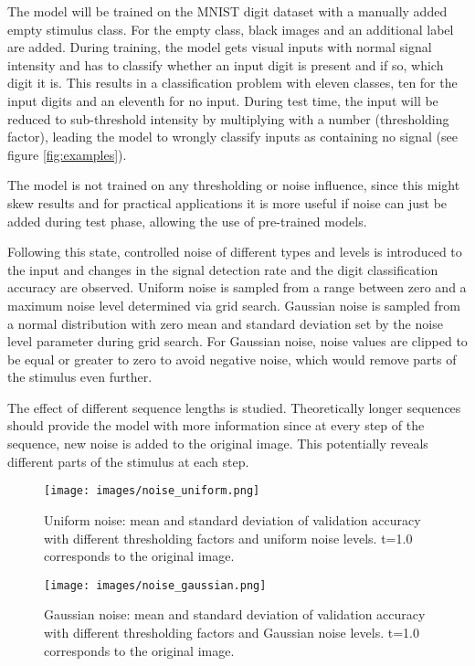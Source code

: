 \documentclass{article}
\begin{document}
The model will be trained on the MNIST digit dataset with a manually added empty stimulus class. For the empty class, black images and an additional label are added. During training, the model gets visual inputs with normal signal intensity and has to classify whether an input digit is present and if so, which digit it is. This results in a classification problem with eleven classes, ten for the input digits and an eleventh for no input. During test time, the input will be reduced to sub-threshold intensity by multiplying with a number (thresholding factor), leading the model to wrongly classify inputs as containing no signal (see figure \ref{fig:examples}).

The model is not trained on any thresholding or noise influence, since this might skew results and for practical applications it is more useful if noise can just be added during test phase, allowing the use of pre-trained models.

Following this state, controlled noise of different types and levels is introduced to the input and changes in the signal detection rate and the digit classification accuracy are observed. Uniform noise is sampled from a range between zero and a maximum noise level determined via grid search. Gaussian noise is sampled from a normal distribution with zero mean and standard deviation set by the noise level parameter during grid search. For Gaussian noise, noise values are clipped to be equal or greater to zero to avoid negative noise, which would remove parts of the stimulus even further.

The effect of different sequence lengths is studied. Theoretically longer sequences should provide the model with more information since at every step of the sequence, new noise is added to the original image. This potentially reveals different parts of the stimulus at each step.

\begin{figure}[thb]
\centering
\begin{minipage}{.475\textwidth}
    \centering
	\texttt{[image: images/noise\_uniform.png]}
	\caption{Uniform noise: mean and standard deviation of validation accuracy with different thresholding factors and uniform noise levels. t=1.0 corresponds to the original image.}
	\label{fig:noise_uniform}
\end{minipage}
\hfill
\begin{minipage}{.475\textwidth}
    \centering
	\texttt{[image: images/noise\_gaussian.png]}
	\caption{Gaussian noise: mean and standard deviation of validation accuracy with different thresholding factors and Gaussian noise levels. t=1.0 corresponds to the original image.}
	\label{fig:noise_gaussian}
\end{minipage}
\end{figure}
\end{document}
